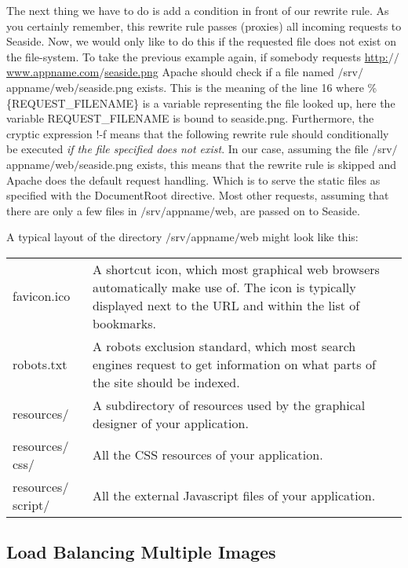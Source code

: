 \documentclass[a4paper,10pt,twoside]{book}
\newcommand{\ct}[1]{{\small\ttfamily\textup{#1}}}
\begin{document}
The next thing we have to do is add a condition in front of our rewrite rule. As you certainly remember, this rewrite rule passes (proxies) all incoming requests to Seaside. Now, we would only like to do this if the requested file does not exist on the file-system. To take the previous example again, if somebody requests \href{http://www.appname.com/seaside.png}{http:$/$$/$www.appname.com$/$seaside.png} Apache should check if a file named \ct{$/$srv$/$appname$/$web$/$seaside.png} exists. 
This is the meaning of the line 16 where \ct{\%\{REQUEST\_FILENAME\}} is a variable representing the file looked up, here the variable  \ct{REQUEST\_FILENAME} is bound to \ct{seaside.png}. Furthermore, the cryptic expression \ct{!-f} means that the following rewrite rule should conditionally be executed \textit{if the file specified does not exist}. In our case, assuming the file \ct{$/$srv$/$appname$/$web$/$seaside.png} exists, this means that the rewrite rule is skipped and Apache does the default request handling. Which is to serve the static files as specified with the \ct{DocumentRoot} directive. Most other requests, assuming that there are only a few files in \ct{$/$srv$/$appname$/$web}, are passed on to Seaside.

A typical layout of the directory \ct{$/$srv$/$appname$/$web} might look like this:

\begin{tabularx}{\textwidth}{lX}
 \ct{favicon.ico} & A shortcut icon, which most graphical web browsers automatically  make use of. The icon is typically displayed next to the URL and within the list of bookmarks.\\
 \ct{robots.txt} & A robots exclusion standard, which most search engines request to get information on what parts of the site should be indexed.\\
 \ct{resources$/$} & A subdirectory of resources used by the graphical designer of your application.\\
 \ct{resources$/$css$/$} & All the CSS resources of your application.\\
 \ct{resources$/$script$/$} & All the external Javascript files of your application.\\
\end{tabularx}

\subsection{Load Balancing Multiple Images}
\label{book:advanced:deployment:deploymentapache:modproxybalancer}
\end{document}
